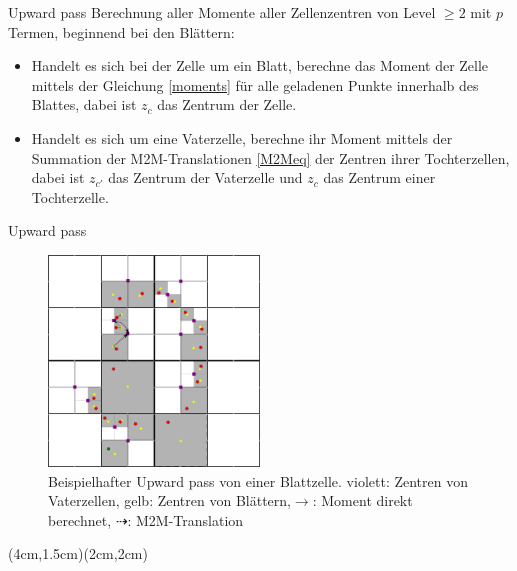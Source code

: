 \documentclass[ngerman]{beamer}
\begin{document}
\begin{frame}{Upward pass}
Berechnung aller Momente aller Zellenzentren von Level $\geq 2$ mit $p$ Termen, beginnend bei den Blättern:
\begin{itemize}
\item Handelt es sich bei der Zelle um ein Blatt, berechne das Moment der Zelle mittels der Gleichung \eqref{moments} für alle geladenen Punkte innerhalb des Blattes, dabei ist $z_c$ das Zentrum der Zelle.
\item Handelt es sich um eine Vaterzelle, berechne ihr Moment mittels der Summation der M2M-Translationen \eqref{M2Meq} der Zentren ihrer Tochterzellen, dabei ist $z_{c'}$ das Zentrum der Vaterzelle und $z_c$ das Zentrum einer Tochterzelle.
\end{itemize}
\end{frame}

\begin{frame}{Upward pass}
\begin{figure}
\includegraphics[width=0.5\textwidth]{upward.png}
\caption{Beispielhafter Upward pass von einer Blattzelle. \linebreak violett: Zentren von Vaterzellen, gelb: Zentren von Blättern,\linebreak $\rightarrow$: Moment direkt berechnet, $\dashrightarrow$: M2M-Translation}
\end{figure}
(4cm,1.5cm)(2cm,2cm)
\end{frame}
\end{document}
